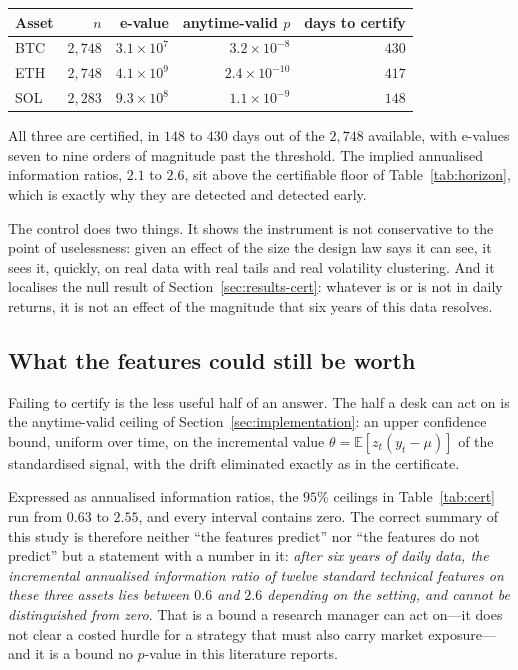 \documentclass{article}
\theoremstyle{plain}
\theoremstyle{definition}
\begin{document}
\begin{center}
  \small
  \begin{tabular}{lrrrr}
    \toprule
    Asset & $n$ & e-value & anytime-valid $p$ & days to certify \\
    \midrule
    BTC & $2{,}748$ & $3.1\times10^{7}$ & $3.2\times10^{-8}$  & $430$ \\
    ETH & $2{,}748$ & $4.1\times10^{9}$ & $2.4\times10^{-10}$ & $417$ \\
    SOL & $2{,}283$ & $9.3\times10^{8}$ & $1.1\times10^{-9}$  & $148$ \\
    \bottomrule
  \end{tabular}
\end{center}

All three are certified, in $148$ to $430$ days out of the $2{,}748$ available, with e-values
seven to nine orders of magnitude past the threshold. The implied annualised information
ratios, $2.1$ to $2.6$, sit above the certifiable floor of Table~\ref{tab:horizon}, which is
exactly why they are detected and detected early.

The control does two things. It shows the instrument is not conservative to the point of
uselessness: given an effect of the size the design law says it can see, it sees it, quickly,
on real data with real tails and real volatility clustering. And it localises the null result
of Section~\ref{sec:results-cert}: whatever is or is not in daily returns, it is not an effect
of the magnitude that six years of this data resolves.

\subsection{What the features could still be worth}
\label{sec:ceiling}

Failing to certify is the less useful half of an answer. The half a desk can act on is the
anytime-valid ceiling of Section~\ref{sec:implementation}: an upper confidence bound,
uniform over time, on the incremental value $\theta=\mathbb{E}[z_t(y_t-\mu)]$ of the
standardised signal, with the drift eliminated exactly as in the certificate.

Expressed as annualised information ratios, the $95\%$ ceilings in Table~\ref{tab:cert} run
from $0.63$ to $2.55$, and every interval contains zero. The correct summary of this study
is therefore neither ``the features predict'' nor ``the features do not predict'' but a
statement with a number in it: \emph{after six years of daily data, the incremental
annualised information ratio of twelve standard technical features on these three assets
lies between $0.6$ and $2.6$ depending on the setting, and cannot be distinguished from
zero}. That is a bound a research
manager can act on---it does not clear a costed hurdle for a strategy that must also carry
market exposure---and it is a bound no $p$-value in this literature reports.
\end{document}
